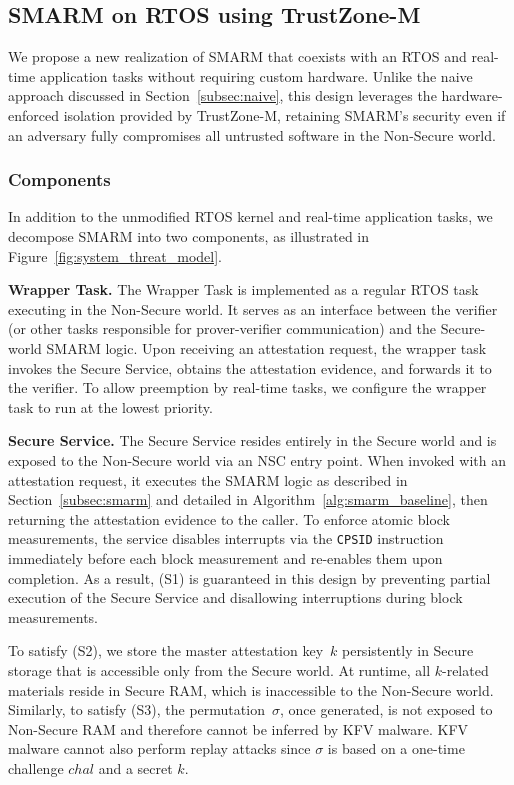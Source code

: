 \documentclass[journal]{IEEEtran}
\begin{document}
\subsection{SMARM on RTOS using TrustZone-M}

We propose a new realization of SMARM that coexists with an RTOS and real-time application tasks without requiring custom hardware.
Unlike the naive approach discussed in Section~\ref{subsec:naive}, this design leverages the hardware-enforced isolation provided by TrustZone-M, retaining SMARM's security even if an adversary fully compromises all untrusted software in the Non-Secure world.

\subsubsection{Components}

In addition to the unmodified RTOS kernel and real-time application tasks, we decompose SMARM into two components, as illustrated in Figure~\ref{fig:system_threat_model}.

\textbf{Wrapper Task.}
The Wrapper Task is implemented as a regular RTOS task executing in the Non-Secure world.
It serves as an interface between the verifier (or other tasks responsible for prover-verifier communication) and the Secure-world SMARM logic.
Upon receiving an attestation request, the wrapper task invokes the Secure Service, obtains the attestation evidence, and forwards it to the verifier.
To allow preemption by real-time tasks, we configure the wrapper task to run at the lowest priority.
    
\textbf{Secure Service.}
The Secure Service resides entirely in the Secure world and is exposed to the Non-Secure world via an NSC entry point.
When invoked with an attestation request, it executes the SMARM logic as described in Section~\ref{subsec:smarm} and detailed in Algorithm~\ref{alg:smarm_baseline}, then returning the attestation evidence to the caller.
To enforce atomic block measurements, the service disables interrupts via the \texttt{CPSID} instruction immediately before each block measurement and re-enables them upon completion.
As a result, (S1) is guaranteed in this design by preventing partial execution of the Secure Service and disallowing interruptions during block measurements.
    
To satisfy (S2), we store the master attestation key~$k$ persistently in Secure storage that is accessible only from the Secure world.
At runtime, all $k$-related materials reside in Secure RAM, which is inaccessible to the Non-Secure world.
Similarly, to satisfy (S3), the permutation~$\sigma$, once generated, is not exposed to Non-Secure RAM and therefore cannot be inferred by KFV malware.
KFV malware cannot also perform replay attacks since $\sigma$ is based on a one-time challenge $chal$ and a secret $k$.
\end{document}
